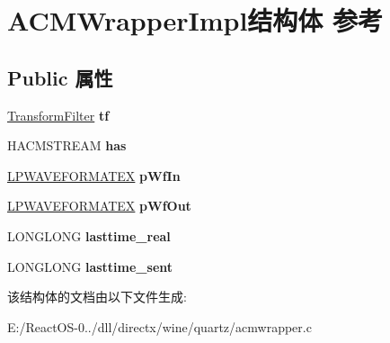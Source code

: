 \hypertarget{struct_a_c_m_wrapper_impl}{}\section{A\+C\+M\+Wrapper\+Impl结构体 参考}
\label{struct_a_c_m_wrapper_impl}
\subsection*{Public 属性}
\begin{DoxyCompactItemize}
\item 
\mbox{\label{struct_a_c_m_wrapper_impl_aa3e508f8c64ac4f5358e28c944a0d1e1}} 
\hyperlink{struct_transform_filter}{Transform\+Filter} {\bfseries tf}
\item 
\mbox{\label{struct_a_c_m_wrapper_impl_ab36c627fa1ea33cbcdf6ef43d8f69a94}} 
H\+A\+C\+M\+S\+T\+R\+E\+AM {\bfseries has}
\item 
\mbox{\label{struct_a_c_m_wrapper_impl_ad136e7b54800c6fe2db0e3f60ab1d300}} 
\hyperlink{struct___w_a_v_e_f_o_r_m_a_t_e_x}{L\+P\+W\+A\+V\+E\+F\+O\+R\+M\+A\+T\+EX} {\bfseries p\+Wf\+In}
\item 
\mbox{\label{struct_a_c_m_wrapper_impl_ab7b4df1cb7013e1791bc13223984df4c}} 
\hyperlink{struct___w_a_v_e_f_o_r_m_a_t_e_x}{L\+P\+W\+A\+V\+E\+F\+O\+R\+M\+A\+T\+EX} {\bfseries p\+Wf\+Out}
\item 
\mbox{\label{struct_a_c_m_wrapper_impl_ae00cd5be7a2aea14d05a181d725c6826}} 
L\+O\+N\+G\+L\+O\+NG {\bfseries lasttime\+\_\+real}
\item 
\mbox{\label{struct_a_c_m_wrapper_impl_a6cd8a1a2590df7a1120a7e60c0387570}} 
L\+O\+N\+G\+L\+O\+NG {\bfseries lasttime\+\_\+sent}
\end{DoxyCompactItemize}


该结构体的文档由以下文件生成\+:\begin{DoxyCompactItemize}
\item 
E\+:/\+React\+O\+S-\/0../dll/directx/wine/quartz/acmwrapper.\+c\end{DoxyCompactItemize}
